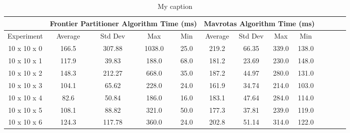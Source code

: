 \documentclass{article}
\begin{document}
	    \begin{table}[]
	    	\footnotesize
	    	\centering
	    	\caption{My caption}
	    	\label{table1}
	    	\begin{tabular}{ccccccccccccc}
	    		\multicolumn{1}{l}{}            & \multicolumn{4}{|c|}{Frontier Partitioner Algorithm Time (ms)}                                                          & \multicolumn{4}{c|}{Mavrotas Algorithm Time (ms) }                                                                      \\ \hline
	    		\multicolumn{1}{c|}{Experiment} & \multicolumn{1}{c|}{Average} & \multicolumn{1}{c|}{Std Dev} & \multicolumn{1}{c|}{Max} & \multicolumn{1}{c|}{Min} & \multicolumn{1}{c|}{Average} & \multicolumn{1}{c|}{Std Dev} & \multicolumn{1}{c|}{Max} & \multicolumn{1}{c|}{Min} \\ \hline
	    		10     x 10   x 0   & 166.5                        & 307.88            & 1038.0                   & 25.0                     & 219.2                        & 66.35           & 339.0                    & 138.0                    \\
	    		10     x 10   x 1   & 117.9                        & 39.83           & 188.0                    & 68.0                     & 181.2                        & 23.69           & 230.0                    & 148.0                    \\
	    		10     x 10   x 2   & 148.3                        & 212.27           & 668.0                    & 35.0                     & 187.2                        & 44.97            & 280.0                    & 131.0                    \\
	    		10     x 10   x 3   & 104.1                        & 65.62            & 228.0                    & 24.0                     & 161.9                        & 34.74           & 214.0                    & 103.0                    \\
	    		10     x 10   x 4   & 82.6                         & 50.84            & 186.0                    & 16.0                     & 183.1                        & 47.64           & 284.0                    & 114.0                    \\
	    		10     x 10   x 5   & 108.1                        & 88.82          & 321.0                    & 50.0                     & 177.3                        & 37.81            & 239.0                    & 119.0                    \\
	    		10     x 10   x 6   & 124.3                        & 117.78           & 360.0                    & 24.0                     & 202.8                        & 51.14            & 314.0                    & 122.0                    \\

\end{tabular}
\end{table}
\end{document}

